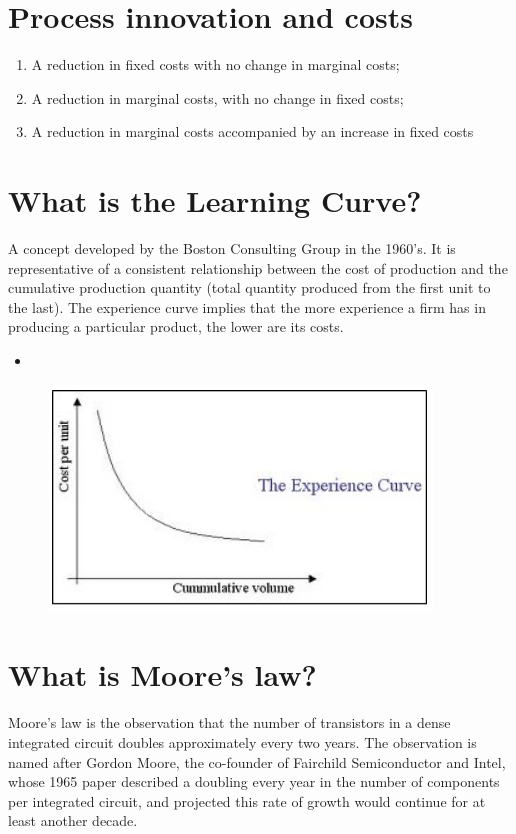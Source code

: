 \section{Process innovation and costs}
\begin{enumerate}
\item A reduction in fixed costs with no change in marginal costs;
\item A reduction in marginal costs, with no change in fixed costs;
\item A reduction in marginal costs accompanied by an increase in fixed costs
\end{enumerate}

\section{What is the Learning Curve?}
A concept developed by the Boston Consulting Group in the 1960's. It is representative of a consistent relationship between the cost of production and the cumulative production quantity (total quantity produced from the first unit to the last). The experience curve implies that the more experience a firm has in producing a particular product, the lower are its costs.

\begin{itemize}
\item 
\end{itemize}

\begin{figure}[h]
\begin{center}
\includegraphics{LearningCurve}
\end{center}
\end{figure}

\section{What is Moore's law?}
Moore's law is the observation that the number of transistors in a dense integrated circuit doubles approximately every two years. The observation is named after Gordon Moore, the co-founder of Fairchild Semiconductor and Intel, whose 1965 paper described a doubling every year in the number of components per integrated circuit, and projected this rate of growth would continue for at least another decade.








